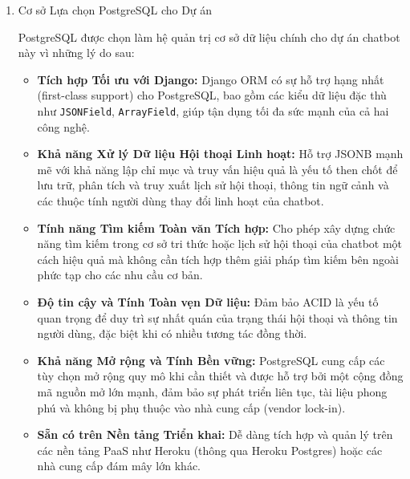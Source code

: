 \begin{enumerate}[label=\arabic*., font=\bfseries]
    \item Cơ sở Lựa chọn PostgreSQL cho Dự án

    PostgreSQL được chọn làm hệ quản trị cơ sở dữ liệu chính cho dự án chatbot này vì những lý do sau:
    \begin{itemize}
        \item \textbf{Tích hợp Tối ưu với Django:} Django ORM có sự hỗ trợ hạng nhất (first-class support) cho PostgreSQL, bao gồm các kiểu dữ liệu đặc thù như \texttt{JSONField}, \texttt{ArrayField}, giúp tận dụng tối đa sức mạnh của cả hai công nghệ.
        \item \textbf{Khả năng Xử lý Dữ liệu Hội thoại Linh hoạt:} Hỗ trợ JSONB mạnh mẽ với khả năng lập chỉ mục và truy vấn hiệu quả là yếu tố then chốt để lưu trữ, phân tích và truy xuất lịch sử hội thoại, thông tin ngữ cảnh và các thuộc tính người dùng thay đổi linh hoạt của chatbot.
        \item \textbf{Tính năng Tìm kiếm Toàn văn Tích hợp:} Cho phép xây dựng chức năng tìm kiếm trong cơ sở tri thức hoặc lịch sử hội thoại của chatbot một cách hiệu quả mà không cần tích hợp thêm giải pháp tìm kiếm bên ngoài phức tạp cho các nhu cầu cơ bản.
        \item \textbf{Độ tin cậy và Tính Toàn vẹn Dữ liệu:} Đảm bảo ACID là yếu tố quan trọng để duy trì sự nhất quán của trạng thái hội thoại và thông tin người dùng, đặc biệt khi có nhiều tương tác đồng thời.
        \item \textbf{Khả năng Mở rộng và Tính Bền vững:} PostgreSQL cung cấp các tùy chọn mở rộng quy mô khi cần thiết và được hỗ trợ bởi một cộng đồng mã nguồn mở lớn mạnh, đảm bảo sự phát triển liên tục, tài liệu phong phú và không bị phụ thuộc vào nhà cung cấp (vendor lock-in).
        \item \textbf{Sẵn có trên Nền tảng Triển khai:} Dễ dàng tích hợp và quản lý trên các nền tảng PaaS như Heroku (thông qua Heroku Postgres) hoặc các nhà cung cấp đám mây lớn khác.
    \end{itemize}
\end{enumerate}


